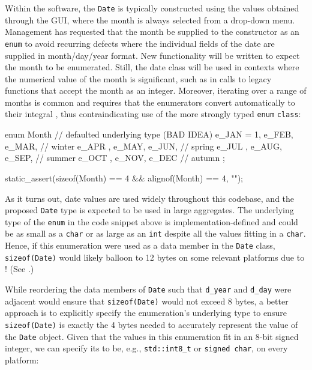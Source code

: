 \noindent Within the software, the \lstinline!Date! is typically constructed using
the values obtained through the GUI, where the month is always selected
from a drop-down menu. Management has requested that the month be
supplied to the constructor as an \lstinline!enum! to avoid recurring
defects where the individual fields of the date are supplied in
month/day/year format. New functionality will be written to expect the
month to be enumerated. Still, the date class will be used in contexts
where the numerical value of the month is significant, such as in calls
to legacy functions that accept the month as an integer. Moreover,
iterating over a range of months is common and requires that the
enumerators convert automatically to their integral , thus contraindicating use of the more strongly typed
\lstinline!enum! \lstinline!class!:

\begin{emcppslisting}
enum Month  // defaulted underlying type (BAD IDEA)
{
    e_JAN = 1, e_FEB, e_MAR,    // winter
    e_APR    , e_MAY, e_JUN,    // spring
    e_JUL    , e_AUG, e_SEP,    // summer
    e_OCT    , e_NOV, e_DEC     // autumn
};

static_assert(sizeof(Month) == 4 && alignof(Month) == 4, "");
\end{emcppslisting}

\noindent As it turns out, date values are used widely throughout this codebase,
and the proposed \lstinline!Date! type is expected to be used in large
aggregates. The underlying type of the \lstinline!enum! in the code snippet
above is implementation-defined and could be as small as a \lstinline!char!
or as large as an \lstinline!int! despite all the values fitting in a
\lstinline!char!. Hence, if this enumeration were used as a data member in
the \lstinline!Date! class, \lstinline!sizeof(Date)! would likely balloon to
12 bytes on some relevant platforms due to !
(See .)

While reordering the data members of \lstinline!Date! such that \lstinline!d_year! and
\lstinline!d_day! were adjacent would ensure that \lstinline!sizeof(Date)!
would not exceed 8 bytes, a better approach is to explicitly specify the
enumeration's underlying type to ensure \lstinline!sizeof(Date)! is exactly
the 4 bytes needed to accurately represent the value of the
\lstinline!Date! object. Given that the values in this enumeration fit in
an 8-bit signed integer, we can specify its  to
be, e.g., \lstinline!std::int8_t! or \lstinline!signed!~\lstinline!char!, on
every platform:

